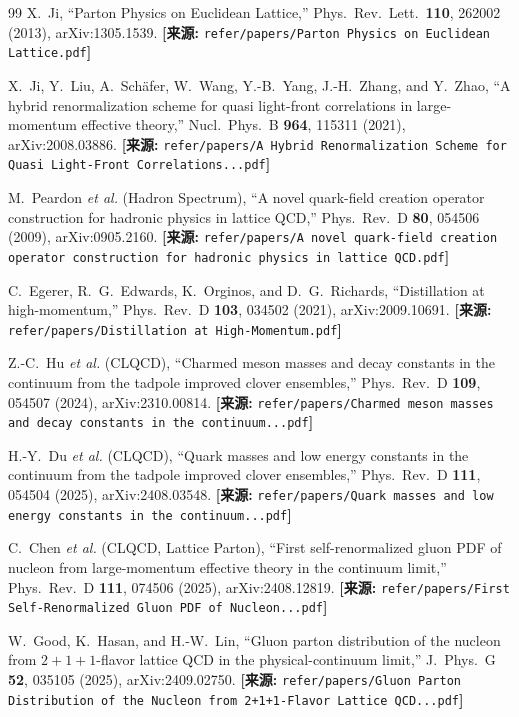 \documentclass[12pt,a4paper]{ctexart}
\theoremstyle{definition}
\begin{document}
\begin{thebibliography}{99}
X.~Ji,
``Parton Physics on Euclidean Lattice,''
Phys.\ Rev.\ Lett.\ \textbf{110}, 262002 (2013), arXiv:1305.1539.
\quad\textbf{[来源:} \texttt{refer/papers/Parton Physics on Euclidean Lattice.pdf}\textbf{]}

X.~Ji, Y.~Liu, A.~Sch\"afer, W.~Wang, Y.-B.~Yang, J.-H.~Zhang, and Y.~Zhao,
``A hybrid renormalization scheme for quasi light-front correlations in large-momentum effective theory,''
Nucl.\ Phys.\ B \textbf{964}, 115311 (2021), arXiv:2008.03886.
\quad\textbf{[来源:} \texttt{refer/papers/A Hybrid Renormalization Scheme for Quasi Light-Front Correlations...pdf}\textbf{]}

M.~Peardon \textit{et al.} (Hadron Spectrum),
``A novel quark-field creation operator construction for hadronic physics in lattice QCD,''
Phys.\ Rev.\ D \textbf{80}, 054506 (2009), arXiv:0905.2160.
\quad\textbf{[来源:} \texttt{refer/papers/A novel quark-field creation operator construction for hadronic physics in lattice QCD.pdf}\textbf{]}

C.~Egerer, R.~G.~Edwards, K.~Orginos, and D.~G.~Richards,
``Distillation at high-momentum,''
Phys.\ Rev.\ D \textbf{103}, 034502 (2021), arXiv:2009.10691.
\quad\textbf{[来源:} \texttt{refer/papers/Distillation at High-Momentum.pdf}\textbf{]}

Z.-C.~Hu \textit{et al.} (CLQCD),
``Charmed meson masses and decay constants in the continuum from the tadpole improved clover ensembles,''
Phys.\ Rev.\ D \textbf{109}, 054507 (2024), arXiv:2310.00814.
\quad\textbf{[来源:} \texttt{refer/papers/Charmed meson masses and decay constants in the continuum...pdf}\textbf{]}

H.-Y.~Du \textit{et al.} (CLQCD),
``Quark masses and low energy constants in the continuum from the tadpole improved clover ensembles,''
Phys.\ Rev.\ D \textbf{111}, 054504 (2025), arXiv:2408.03548.
\quad\textbf{[来源:} \texttt{refer/papers/Quark masses and low energy constants in the continuum...pdf}\textbf{]}

C.~Chen \textit{et al.} (CLQCD, Lattice Parton),
``First self-renormalized gluon PDF of nucleon from large-momentum effective theory in the continuum limit,''
Phys.\ Rev.\ D \textbf{111}, 074506 (2025), arXiv:2408.12819.
\quad\textbf{[来源:} \texttt{refer/papers/First Self-Renormalized Gluon PDF of Nucleon...pdf}\textbf{]}

W.~Good, K.~Hasan, and H.-W.~Lin,
``Gluon parton distribution of the nucleon from $2+1+1$-flavor lattice QCD in the physical-continuum limit,''
J.\ Phys.\ G \textbf{52}, 035105 (2025), arXiv:2409.02750.
\quad\textbf{[来源:} \texttt{refer/papers/Gluon Parton Distribution of the Nucleon from 2+1+1-Flavor Lattice QCD...pdf}\textbf{]}


\end{thebibliography}
\end{document}
